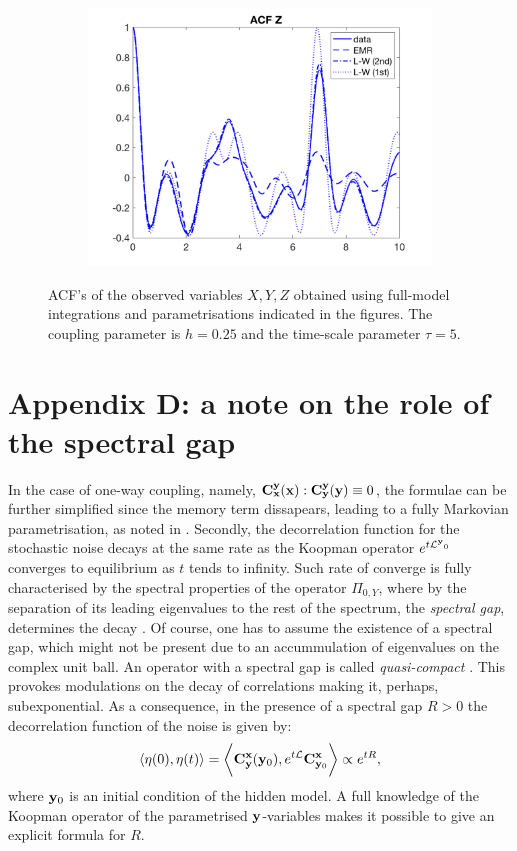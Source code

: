 \documentclass[12pt]{article}
\begin{document}
\begin{figure}[H]
\begin{subfigure}[b]{0.3\textwidth}
		\includegraphics[width=\textwidth]{plots/l84l63/acfz025z.png}
	\end{subfigure}
	\hfill
	\caption{ACF's of the observed variables $X,Y,Z$ obtained using full-model integrations and parametrisations indicated in the figures. The coupling parameter is $h=0.25$ and the time-scale parameter $\tau =5$.}
\end{figure}


\section*{Appendix D: a note on the role of the spectral gap}
In the case of one-way coupling, namely, $\mathbf{C}^{\mathbf{y}} _{\mathbf{x}}(\mathbf{x}):\mathbf{C}^{\mathbf{y}} _{\mathbf{y}}(\mathbf{y})\equiv 0$, the formulae can be further simplified since the memory term dissapears, leading to a fully Markovian parametrisation, as noted in \cite{Vissio2018b}. Secondly, the decorrelation function for the stochastic noise decays at the same rate as the Koopman operator $e^{t\mathcal{L}^{\mathbf{y}}{}_0}$ converges to equilibrium as $t$ tends to infinity. Such rate of converge is fully characterised by the spectral properties of the operator $\Pi _{0,Y}$, where by the separation of its leading eigenvalues to the rest of the spectrum, the \emph{spectral gap}, determines the decay \cite{engelsemigroups2006}. Of course, one has to assume the existence of a spectral gap, which might not be present due to an accummulation of eigenvalues on the complex unit ball. An operator with a spectral gap is called \emph{quasi-compact} \cite{engelsemigroups2006}. This provokes modulations on the decay of correlations making it, perhaps, subexponential. As a consequence, in the presence of a spectral gap $R>0$ the decorrelation function of the noise is given by: 
\begin{equation}
\langle \eta (0), \eta (t)\rangle=\bigg \langle \mathbf{C}^{\mathbf{x}}_{\mathbf{y}}(\mathbf{y}_0),e^{t\mathcal{L}}\mathbf{C}^{\mathbf{x}}_{\mathbf{y}_0} \bigg \rangle\propto e^{tR},
\end{equation}
where $\mathbf{y}_0$ is an initial condition of the hidden model. A full knowledge of the Koopman operator of the parametrised $\mathbf{y}$-variables makes it possible to give an explicit formula for $R$. 
\end{document}
